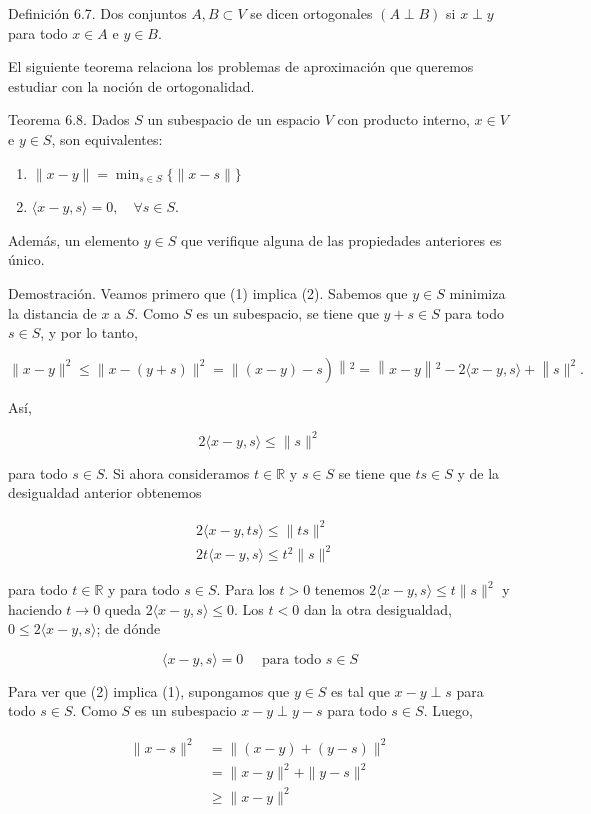 \documentclass[10pt]{book}
\begin{document}
Definición 6.7. Dos conjuntos $A, B \subset V$ se dicen ortogonales $(A \perp B)$ si $x \perp y$ para todo $x \in A$ e $y \in B$.

El siguiente teorema relaciona los problemas de aproximación que queremos estudiar con la noción de ortogonalidad.

Teorema 6.8. Dados $S$ un subespacio de un espacio $V$ con producto interno, $x \in V$ e $y \in S$, son equivalentes:

\begin{enumerate}
  \item $\|x-y\|=\min _{s \in S}\{\|x-s\|\}$
  \item $\langle x-y, s\rangle=0, \quad \forall s \in S$.
\end{enumerate}

Además, un elemento $y \in S$ que verifique alguna de las propiedades anteriores es único.

Demostración. Veamos primero que (1) implica (2). Sabemos que $y \in S$ minimiza la distancia de $x$ a $S$. Como $S$ es un subespacio, se tiene que $y+s \in S$ para todo $s \in S$, y por lo tanto,

$$
\left.\|x-y\|^{2} \leq\|x-(y+s)\|^{2}=\|(x-y)-s\right)\left\|^{2}=\right\| x-y\left\|^{2}-2\langle x-y, s\rangle+\right\| s \|^{2} .
$$

Así,

$$
2\langle x-y, s\rangle \leq\|s\|^{2}
$$

para todo $s \in S$. Si ahora consideramos $t \in \mathbb{R}$ y $s \in S$ se tiene que $t s \in S$ y de la desigualdad anterior obtenemos

$$
\begin{aligned}
& 2\langle x-y, t s\rangle \leq\|t s\|^{2} \\
& 2 t\langle x-y, s\rangle \leq t^{2}\|s\|^{2}
\end{aligned}
$$

para todo $t \in \mathbb{R}$ y para todo $s \in S$. Para los $t>0$ tenemos $2\langle x-y, s\rangle \leq t\|s\|^{2}$ y haciendo $t \rightarrow 0$ queda $2\langle x-y, s\rangle \leq 0$. Los $t<0$ dan la otra desigualdad, $0 \leq 2\langle x-y, s\rangle$; de dónde

$$
\langle x-y, s\rangle=0 \quad \text { para todo } s \in S
$$

Para ver que (2) implica (1), supongamos que $y \in S$ es tal que $x-y \perp s$ para todo $s \in S$. Como $S$ es un subespacio $x-y \perp y-s$ para todo $s \in S$. Luego,

$$
\begin{aligned}
\|x-s\|^{2} & =\|(x-y)+(y-s)\|^{2} \\
& =\|x-y\|^{2}+\|y-s\|^{2} \\
& \geq\|x-y\|^{2}
\end{aligned}
$$
\end{document}
